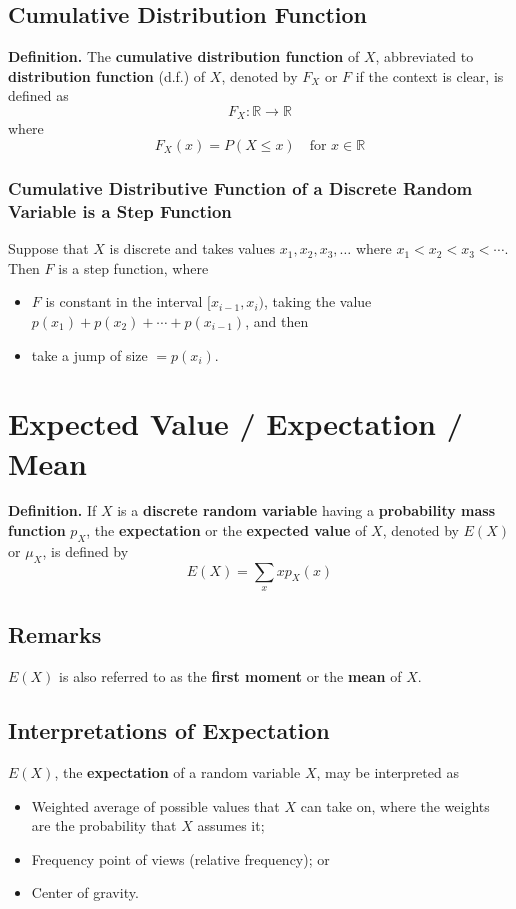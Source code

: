 \documentclass[../st2131_notes.tex]{subfiles}
\begin{document}
\subsection{Cumulative Distribution Function}
\textbf{Definition.} The \textbf{cumulative distribution function} of \(X\), abbreviated to \textbf{distribution function} (d.f.) of \(X\), denoted by \(F_X\) or \(F\) if the context is clear, is defined as
\[F_X:\mathbb{R}\to\mathbb{R}\]
where
\[F_X(x)=P(X\leq x)\quad\text{for }x\in\mathbb{R}\]

\subsubsection{Cumulative Distributive Function of a Discrete Random Variable is a Step Function}
Suppose that \(X\) is discrete and takes values \(x_1,x_2,x_3,\ldots\) where \(x_1<x_2<x_3<\cdots\). Then \(F\) is a step function, where
\begin{itemize}
	\item\(F\) is constant in the interval \([x_{i-1},x_i)\), taking the value \(p(x_1)+p(x_2)+\cdots+p(x_{i-1})\), and then
	\item take a jump of size \(=p(x_i)\).
\end{itemize}

\section{Expected Value / Expectation / Mean}
\textbf{Definition.} If \(X\) is a \textbf{discrete random variable} having a \textbf{probability mass function} \(p_X\), the \textbf{expectation} or the \textbf{expected value} of \(X\), denoted by \(E(X)\) or \(\mu_X\), is defined by
\[E(X)=\sum_xxp_X(x)\]

\subsection{Remarks}
\(E(X)\) is also referred to as the \textbf{first moment} or the \textbf{mean} of \(X\).

\subsection{Interpretations of Expectation}
\(E(X)\), the \textbf{expectation} of a random variable \(X\), may be interpreted as
\begin{itemize}
	\item Weighted average of possible values that \(X\) can take on, where the weights are the probability that \(X\) assumes it;
	\item Frequency point of views (relative frequency); or
	\item Center of gravity.
\end{itemize}
\end{document}
